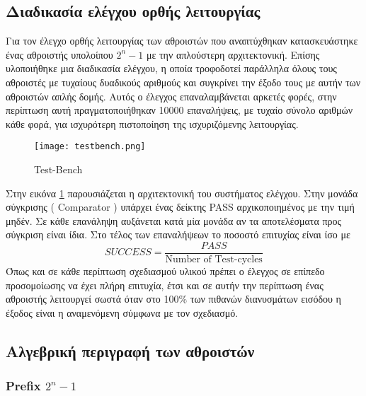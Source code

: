 \subsection{Διαδικασία ελέγχου ορθής λειτουργίας}
Για τον έλεγχο ορθής λειτουργίας των αθροιστών που αναπτύχθηκαν κατασκευάστηκε ένας αθροιστής 
υπολοίπου $2^n-1$ με την απλούστερη αρχιτεκτονική. Επίσης υλοποιήθηκε μια διαδικασία ελέγχου,
η οποία τροφοδοτεί παράλληλα όλους τους αθροιστές με τυχαίους δυαδικούς αριθμούς και συγκρίνει 
την έξοδο τους με αυτήν των αθροιστών απλής δομής. Αυτός ο έλεγχος επαναλαμβάνεται αρκετές 
φορές, στην περίπτωση αυτή πραγματοποιήθηκαν 10000 επαναλήψεις, με τυχαίο σύνολο αριθμών 
κάθε φορά, για ισχυρότερη πιστοποίηση της ισχυριζόμενης λειτουργίας.
\begin{figure}[H]
\centering
\texttt{[image: testbench.png]}
\caption{Test-Bench}
\label{fig:testbench}
\end{figure}
Στην εικόνα \ref{fig:testbench} παρουσιάζεται η αρχιτεκτονική του συστήματος ελέγχου. Στην 
μονάδα σύγκρισης ( Comparator ) υπάρχει ένας δείκτης PASS αρχικοποιημένος με την τιμή μηδέν.
Σε κάθε επανάληψη αυξάνεται κατά μία μονάδα αν τα αποτελέσματα προς σύγκριση είναι ίδια.
Στο τέλος των επαναλήψεων το ποσοστό επιτυχίας είναι ίσο με 
\begin{equation*}
    SUCCESS = \frac{PASS}{\text{Number of Test-cycles}}
\end{equation*}
Όπως και σε κάθε περίπτωση σχεδιασμού υλικού πρέπει ο έλεγχος σε επίπεδο προσομοίωσης να
έχει πλήρη επιτυχία, έτσι και σε αυτήν την περίπτωση ένας αθροιστής λειτουργεί σωστά όταν 
στο 100\% των πιθανών διανυσμάτων εισόδου η έξοδος είναι η αναμενόμενη σύμφωνα με τον σχεδιασμό.









\subsection{Αλγεβρική περιγραφή των αθροιστών}
\subsubsection{Prefix $2^n-1$}

